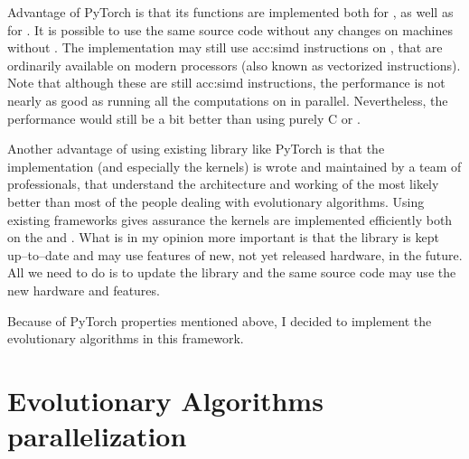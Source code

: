 Advantage of PyTorch is that its functions are implemented both for \cpuns, as well as for \gpuns. It is possible to use the same source code without any changes on machines without \gpuns. The implementation may still use \acrshort{acc:simd} instructions on \cpuns, that are ordinarily available on modern processors (also known as vectorized instructions). Note that although these are still \acrshort{acc:simd} instructions, the performance is not nearly as good as running all the computations on \gpu in parallel. Nevertheless, the performance would still be a bit better than using purely C or \cppns.

Another advantage of using existing library like PyTorch is that the implementation (and especially the \cuda kernels) is wrote and maintained by a team of professionals, that understand the architecture and working of the \gpu most likely better than most of the people dealing with evolutionary algorithms. Using existing frameworks gives assurance the kernels are implemented efficiently both on the \gpu and \cpuns. What is in my opinion more important is that the library is kept up--to--date and may use features of new, not yet released hardware, in the future. All we need to do is to update the library and the same source code may use the new hardware and features.

Because of PyTorch properties mentioned above, I decided to implement the evolutionary algorithms in this framework.




\section{Evolutionary Algorithms parallelization}
